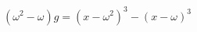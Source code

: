\documentclass[preview]{standalone}
\begin{document}
\begin{center}
$(\omega^2-\omega)g=(x-\omega^2)^3-(x-\omega)^3$
\end{center}
\end{document}
